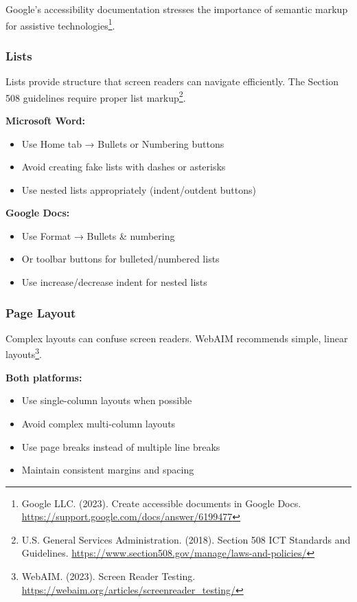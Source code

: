 Google's accessibility documentation stresses the importance of semantic markup for assistive technologies\footnote{Google LLC. (2023). Create accessible documents in Google Docs. \url{https://support.google.com/docs/answer/6199477}}.

\subsubsection{Lists}
Lists provide structure that screen readers can navigate efficiently. The Section 508 guidelines require proper list markup\footnote{U.S. General Services Administration. (2018). Section 508 ICT Standards and Guidelines. \url{https://www.section508.gov/manage/laws-and-policies/}}.

\textbf{Microsoft Word:}
\begin{itemize}
\item Use Home tab → Bullets or Numbering buttons
\item Avoid creating fake lists with dashes or asterisks
\item Use nested lists appropriately (indent/outdent buttons)
\end{itemize}

\textbf{Google Docs:}
\begin{itemize}
\item Use Format → Bullets \& numbering
\item Or toolbar buttons for bulleted/numbered lists
\item Use increase/decrease indent for nested lists
\end{itemize}

\subsubsection{Page Layout}
Complex layouts can confuse screen readers. WebAIM recommends simple, linear layouts\footnote{WebAIM. (2023). Screen Reader Testing. \url{https://webaim.org/articles/screenreader_testing/}}.

\textbf{Both platforms:}
\begin{itemize}
\item Use single-column layouts when possible
\item Avoid complex multi-column layouts
\item Use page breaks instead of multiple line breaks
\item Maintain consistent margins and spacing
\end{itemize}

